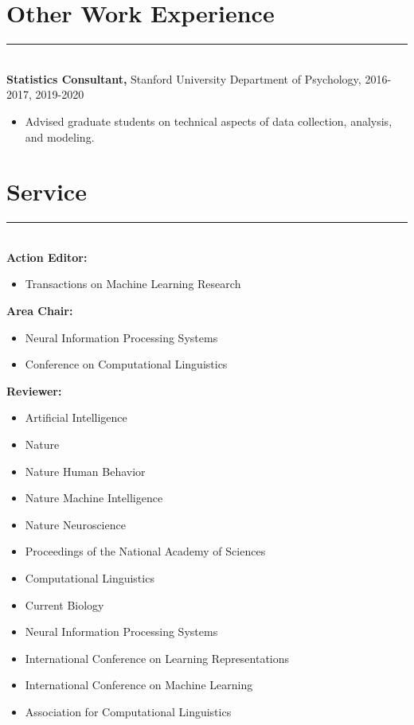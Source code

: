 \documentclass[margin]{res}
\begin{document}
\begin{resume}
\vspace{1pt}\section{Other Work Experience} \vspace{-15pt} \rule{\textwidth}{0.5pt} \\[3pt]
{\bf Statistics Consultant,} Stanford University Department of Psychology, 2016-2017, 2019-2020
\begin{itemize} \itemsep -2pt
 \item Advised graduate students on technical aspects of data collection, analysis, and modeling. \end{itemize}
\vspace{1pt}\section{Service} \vspace{-15pt} \rule{\textwidth}{0.5pt} \\[3pt]
{\bf Action Editor:}
\begin{itemize} \itemsep -2pt
 \item Transactions on Machine Learning Research
\end{itemize}
{\bf Area Chair:}
\begin{itemize} \itemsep -2pt
 \item Neural Information Processing Systems 
 \item Conference on Computational Linguistics
\end{itemize}
{\bf Reviewer:} 
\begin{itemize} \itemsep -2pt
 \item Artificial Intelligence
 \item Nature
 \item Nature Human Behavior 
 \item Nature Machine Intelligence 
 \item Nature Neuroscience 
 \item Proceedings of the National Academy of Sciences
 \item Computational Linguistics
 \item Current Biology 
 \item Neural Information Processing Systems
 \item International Conference on Learning Representations 
 \item International Conference on Machine Learning
 \item Association for Computational Linguistics

\end{itemize}
\end{resume}
\end{document}
